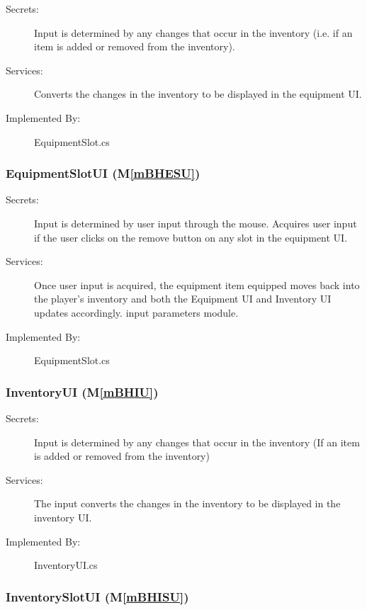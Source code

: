 \documentclass[12pt, titlepage]{article}
\newcommand{\mref}[1]{M\ref{#1}}
\begin{document}
\begin{description}
\item[Secrets:] Input is determined by any changes that occur in the inventory (i.e. if an item is added or removed from the inventory).
\item[Services:] Converts the changes in the inventory to be displayed in the equipment UI.
\item[Implemented By:] EquipmentSlot.cs
\end{description}

\subsubsection{EquipmentSlotUI (\mref{mBHESU})}

\begin{description}
\item[Secrets:] Input is determined by user input through the mouse. Acquires user input if the user clicks on the remove button on any slot in the equipment UI.
\item[Services:] Once user input is acquired, the equipment item equipped moves back into the player's inventory and both the Equipment UI and Inventory UI updates accordingly.
  input parameters module.
\item[Implemented By:] EquipmentSlot.cs
\end{description}

\subsubsection{InventoryUI (\mref{mBHIU})}

\begin{description}
\item[Secrets:] Input is determined by any changes that occur in the inventory (If an item is added or removed from the inventory) 
\item[Services:] The input converts the changes in the inventory to be displayed in the inventory UI.
\item[Implemented By:] InventoryUI.cs
\end{description}

\subsubsection{InventorySlotUI (\mref{mBHISU})}
\end{document}
